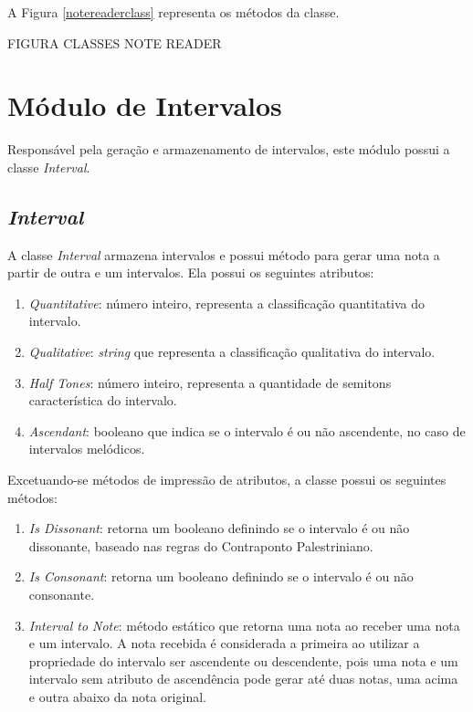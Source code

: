       A Figura \ref{notereaderclass} representa os métodos da classe.

      FIGURA CLASSES NOTE READER

  \section[Módulo de Intervalos]{Módulo de Intervalos}

    Responsável pela geração e armazenamento de intervalos, este módulo possui a classe \textit{Interval}.

    \subsection[\textit{Interval}]{\textit{Interval}}

      A classe \textit{Interval} armazena intervalos e possui método para gerar uma nota a partir de outra e um intervalos. Ela possui os seguintes atributos:

      \begin{enumerate}
        \item \textit{Quantitative}: número inteiro, representa a classificação quantitativa do intervalo.
        \item \textit{Qualitative}: \textit{string} que representa a classificação qualitativa do intervalo.
        \item \textit{Half Tones}: número inteiro, representa a quantidade de semitons característica do intervalo.
        \item \textit{Ascendant}: booleano que indica se o intervalo é ou não ascendente, no caso de intervalos melódicos.
      \end{enumerate}

      Excetuando-se métodos de impressão de atributos, a classe possui os seguintes métodos:

      \begin{enumerate}
        \item \textit{Is Dissonant}: retorna um booleano definindo se o intervalo é ou não dissonante, baseado nas regras do Contraponto Palestriniano.
        \item \textit{Is Consonant}: retorna um booleano definindo se o intervalo é ou não consonante.
        \item \textit{Interval to Note}: método estático que retorna uma nota ao receber uma nota e um intervalo. A nota recebida é considerada a primeira ao utilizar a propriedade do intervalo ser ascendente ou descendente, pois uma nota e um intervalo sem atributo de ascendência pode gerar até duas notas, uma acima e outra abaixo da nota original.
      \end{enumerate}

